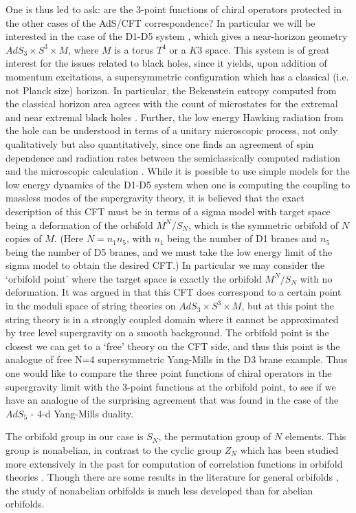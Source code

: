 \documentclass[12pt]{article}
\begin{document}
One is thus led to ask: are the 3-point functions of chiral operators
protected in the other cases of the AdS/CFT
correspondence? In particular we will be interested in the case of
the D1-D5 system \cite{mal,done}, which gives a near-horizon geometry
$AdS_3\times S^3\times M$, where $M$ is a torus $T^4$ or a  $K3$
space.  This system is of great interest for the issues
related to black holes, since it yields, upon addition of momentum
excitations,  a supersymmetric configuration which has a
classical  (i.e. not Planck size) horizon.  In particular, the
Bekenstein entropy computed from the classical horizon area
agrees with the count of microstates for the extremal and near
extremal black holes \cite{stromvafa}. Further,   the low energy  Hawking
radiation from the  hole can be understood in terms of a unitary
microscopic process, not only qualitatively but also
quantitatively, since one finds an agreement of spin dependence and
radiation rates between the semiclassically computed
radiation and the microscopic calculation \cite{dasmathur}. While it
is possible to
use simple models for the low energy dynamics of the
D1-D5 system when one is computing the coupling to massless modes of
the supergravity theory, it is believed that the
exact description of this CFT must be in terms of  a sigma model with
target space being a deformation of the orbifold
$M^N/S_N$, which is the symmetric orbifold of $N$ copies of
$M$.  (Here $N=n_1n_5$, with $n_1$ being the number of
D1 branes and $n_5$ being the number of D5 branes, and we must take
the low energy limit of the sigma model to obtain
the desired CFT.) In particular we may consider the `orbifold point'
where the target space is exactly the orbifold
$M^N/S_N$ with no deformation. It was argued in
\cite{martinec} that this CFT does correspond to a certain point in
the moduli space of string theories on $AdS_3\times
S^3\times M$, but at this point the string theory is in a strongly
coupled domain where it cannot be approximated by
tree level  supergravity on a smooth background. The orbifold point
is the closest we can get to a `free' theory on the CFT
side, and thus this point is the analogue of free N=4 supersymmetric
Yang-Mills in the D3 brane example. Thus one would
like to compare the three point functions of chiral operators in the
supergravity limit with the 3-point functions at the
orbifold point, to see if we have an analogue of the surprising
agreement that was found in the case of the
$AdS_5$ - 4-d Yang-Mills duality.



The orbifold group in our case is $S_N$, the permutation group of $N$
elements. This group is nonabelian, in contrast to the
cyclic group $Z_N$ which has been studied more extensively in the
past for computation of correlation functions in orbifold
theories \cite{dixon}. Though there are some results in the literature for
general orbifolds \cite{vafaorb}, the study of nonabelian orbifolds
is much less
developed than for abelian orbifolds.
\end{document}
